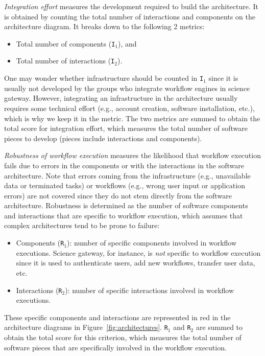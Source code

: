 \documentclass[preprint,3p,twocolumn]{elsarticle}
\begin{document}
\emph{Integration effort} measures the development required to build
the architecture. It is obtained by counting the total number of
interactions and components on the architecture diagram. It breaks
down to the following 2 metrics:
\begin{itemize}[leftmargin=0cm,itemindent=0.35cm,itemsep=0cm]
\item Total number of components (\texttt{I$_1$}), and
\item Total number of interactions (\texttt{I$_2$}).
\end{itemize}
One may wonder whether infrastructure should be counted in
\texttt{I$_1$} since it is usually not developed by the groups who
integrate workflow engines in science gateway. However, integrating an
infrastructure in the architecture usually requires some technical
effort (e.g., account creation, software installation, etc.), which is
why we keep it in the metric. The two metrics are summed to obtain the
total score for integration effort, which measures the total number of
software pieces to develop (pieces include interactions and
components).

\emph{Robustness of workflow execution} measures the likelihood that
workflow execution fails due to errors in the components or with the
interactions in the software architecture. Note that errors coming
from the infrastructure (e.g., unavailable data or terminated tasks) or
workflows (e.g., wrong user input or application errors) are not
covered since they do not stem directly from the software
architecture. Robustness is determined as the number of software
components and interactions that are specific to workflow execution,
which assumes that complex architectures tend to be prone to failure:
\begin{itemize}[leftmargin=0cm,itemindent=0.35cm,itemsep=0cm]
\item Components (\texttt{R$_1$}): number of specific components
  involved in workflow executions. Science
gateway, for instance, is \emph{not} specific to workflow execution
since it is used to authenticate users, add new workflows, transfer
user data, etc.
\item Interactions (\texttt{R$_2$}): number of specific interactions
  involved in workflow executions.
\end{itemize}
These specific components and interactions are represented in red in
the architecture diagrams in
Figure~\ref{fig:architectures}. \texttt{R$_1$} and \texttt{R$_2$}  are summed to obtain the total score for this
criterion, which measures the total number of software pieces that are
specifically involved in the workflow execution.
\end{document}
